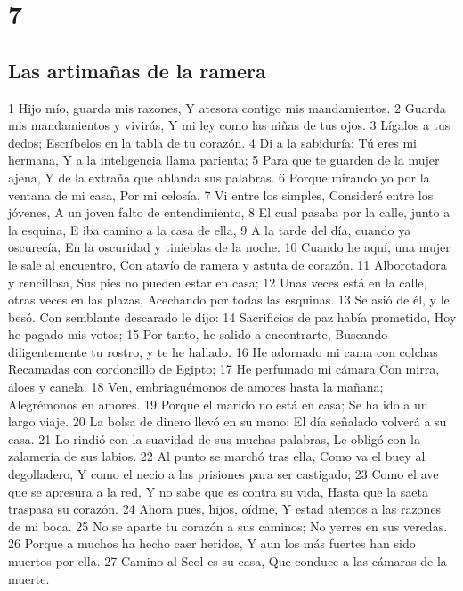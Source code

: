 \chapter{7}

\section*{Las artimañas de la ramera}

1 Hijo mío, guarda mis razones,
Y atesora contigo mis mandamientos.
2 Guarda mis mandamientos y vivirás,
Y mi ley como las niñas de tus ojos.
3 Lígalos a tus dedos;
Escríbelos en la tabla de tu corazón.
4 Di a la sabiduría: Tú eres mi hermana,
Y a la inteligencia llama parienta;
5 Para que te guarden de la mujer ajena,
Y de la extraña que ablanda sus palabras.
6 Porque mirando yo por la ventana de mi casa,
Por mi celosía,
7 Vi entre los simples,
Consideré entre los jóvenes,
A un joven falto de entendimiento,
8 El cual pasaba por la calle, junto a la esquina,
E iba camino a la casa de ella,
9 A la tarde del día, cuando ya oscurecía, 
En la oscuridad y tinieblas de la noche.
10 Cuando he aquí, una mujer le sale al encuentro,
Con atavío de ramera y astuta de corazón.
11 Alborotadora y rencillosa,
Sus pies no pueden estar en casa;
12 Unas veces está en la calle, otras veces en las plazas,
Acechando por todas las esquinas.
13 Se asió de él, y le besó.
Con semblante descarado le dijo:
14 Sacrificios de paz había prometido,
Hoy he pagado mis votos;
15 Por tanto, he salido a encontrarte,
Buscando diligentemente tu rostro, y te he hallado.
16 He adornado mi cama con colchas
Recamadas con cordoncillo de Egipto;
17 He perfumado mi cámara
Con mirra, áloes y canela.
18 Ven, embriaguémonos de amores hasta la mañana;
Alegrémonos en amores.
19 Porque el marido no está en casa;
Se ha ido a un largo viaje.
20 La bolsa de dinero llevó en su mano;
El día señalado volverá a su casa.
21 Lo rindió con la suavidad de sus muchas palabras,
Le obligó con la zalamería de sus labios.
22 Al punto se marchó tras ella,
Como va el buey al degolladero,
Y como el necio a las prisiones para ser castigado;
23 Como el ave que se apresura a la red,
Y no sabe que es contra su vida,
Hasta que la saeta traspasa su corazón.
24 Ahora pues, hijos, oídme,
Y estad atentos a las razones de mi boca.
25 No se aparte tu corazón a sus caminos;
No yerres en sus veredas.
26 Porque a muchos ha hecho caer heridos,
Y aun los más fuertes han sido muertos por ella.
27 Camino al Seol es su casa,
Que conduce a las cámaras de la muerte.

